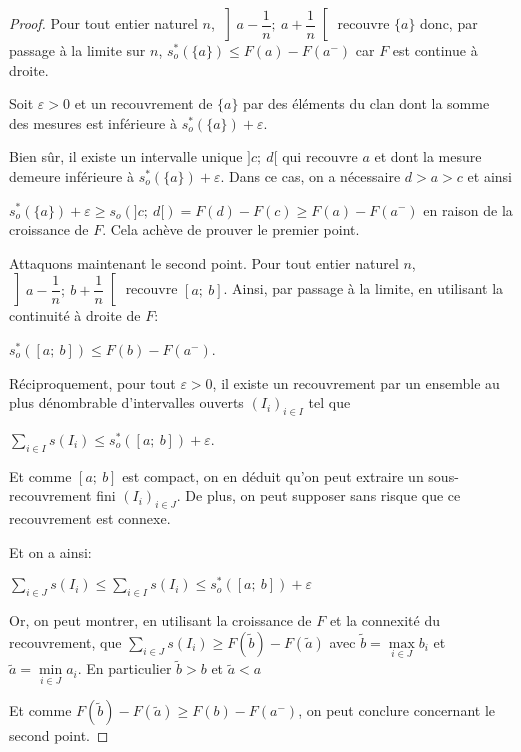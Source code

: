 \begin{proof}
Pour tout entier naturel $n$, $\left]a-\dfrac{1}{n};~a+\dfrac{1}{n}\right[$ recouvre $\{a\}$ donc, par passage à la limite sur $n$, $s_o^{*}\left(\{a\}\right) \leq F(a)-F(a^{-})$ car $F$ est continue à droite.

Soit $\varepsilon>0$ et un recouvrement de $\{a\}$ par des éléments du clan dont la somme des mesures est inférieure à $s_o^{*}\left(\{a\}\right)+ \varepsilon$. 

Bien sûr, il existe un intervalle unique $]c;~d[$ qui recouvre $a$ et dont la mesure demeure inférieure à $s_o^{*}\left(\{a\}\right)+ \varepsilon$. Dans ce cas, on a nécessaire $d > a > c$ et ainsi 

$s_o^{*}\left(\{a\}\right)+ \varepsilon \geq s_o\left(]c;~d[\right) = F(d)-F(c) \geq F(a)-F(a^{-})$ en raison de la croissance de $F$. Cela achève de prouver le premier point.

Attaquons maintenant le second point. Pour tout entier naturel $n$, $\left]a-\dfrac{1}{n};~b+\dfrac{1}{n}\right[$ recouvre $[a;~b]$. Ainsi, par passage à la limite, en utilisant la continuité à droite de $F$:

$s_o^{*}\left([a;~b]\right) \leq F(b)-F(a^{-})$.

Réciproquement, pour tout $\varepsilon > 0$, il existe un recouvrement par un ensemble au plus dénombrable d'intervalles ouverts $\left(I_i\right)_{i \in I}$ tel que 

$\displaystyle{\sum \limits_{i \in I}} s\left(I_i\right) \leq s_o^{*}\left([a;~b]\right)+ \varepsilon$.

Et comme $[a;~b]$ est compact, on en déduit qu'on peut extraire un sous-recouvrement fini $\left(I_i\right)_{i \in J}$. De plus, on peut supposer sans risque que ce recouvrement est connexe.

Et on a ainsi:

$
\displaystyle{\sum \limits_{i \in J}} s\left(I_i\right) \leq \displaystyle{\sum \limits_{i \in I}} s\left(I_i\right) \leq s_o^{*}\left([a;~b]\right)+ \varepsilon
$

Or, on peut montrer, en utilisant la croissance de $F$ et la connexité du recouvrement, que $\displaystyle{\sum \limits_{i \in J}} s\left(I_i\right) \geq F(\tilde{b}) - F(\tilde{a})$ avec $\tilde{b} = \max \limits_{i \in J} b_i$ et $\tilde{a} = \min \limits_{i \in J} a_i$. En particulier $\tilde{b}>b$ et $\tilde{a}<a$

Et comme $F(\tilde{b}) - F(\tilde{a}) \geq F(b)-F(a^{-})$, on peut conclure concernant le second point.


\end{proof}
